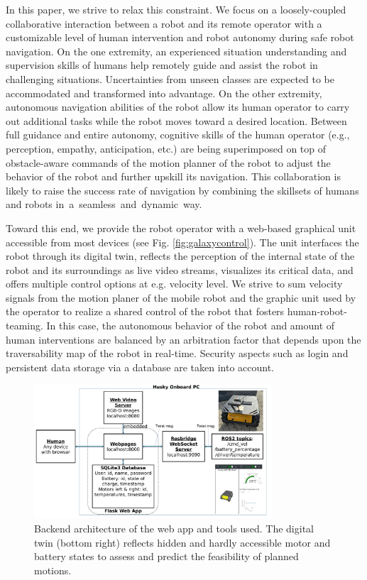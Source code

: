 \documentclass[letterpaper, 10 pt, conference]{ieeeconf}  %
\begin{document}
In this paper, we strive to relax this constraint. We focus on a loosely-coupled collaborative interaction between a  robot and its remote operator  with a customizable level of human intervention and robot autonomy during  safe robot navigation. On the one extremity, an experienced situation understanding and  supervision skills of humans help remotely guide and assist the robot in challenging situations. Uncertainties from unseen classes are expected to be  accommodated and transformed into advantage. On the other extremity, autonomous navigation abilities of the robot allow its human operator to carry out additional tasks while the robot moves toward a desired location. Between full guidance and entire autonomy, cognitive skills of the human operator (e.g., perception, empathy, anticipation, etc.) are being superimposed on top of obstacle-aware commands of the motion planner of the robot to  adjust the behavior of the robot and further upskill its navigation. This collaboration is likely to raise the success rate of  navigation by combining the skillsets of humans and robots \mbox{in a seamless and dynamic way.}



Toward this end, we  provide the robot operator with a web-based graphical unit accessible from most devices (see Fig. \ref{fig:galaxycontrol}). The unit interfaces the robot through its digital twin, reflects the perception of the internal state of the robot and its surroundings as live video streams, visualizes its critical data, and offers multiple control options at e.g. velocity level. We strive to sum  velocity signals from the motion planer of the mobile robot and the graphic unit used by the operator to realize a shared control \cite{phri} of the robot that fosters human-robot-teaming. In this case, the  autonomous behavior of the robot and amount of human interventions are  balanced by an arbitration factor that depends upon the traversability map of the robot in real-time. Security aspects such as login and persistent data storage via a database are taken into account. 

\begin{figure}[t]
	\centerline{\includegraphics[width=8.9cm]{images/ROS_Web_App_Architecture.pdf}}
	\caption{Backend architecture of the web app and tools used. The digital twin (bottom right) reflects hidden and hardly accessible motor and battery states to assess and predict the feasibility of planned motions.}
	\label{fig:userapp}
\end{figure}
\end{document}
